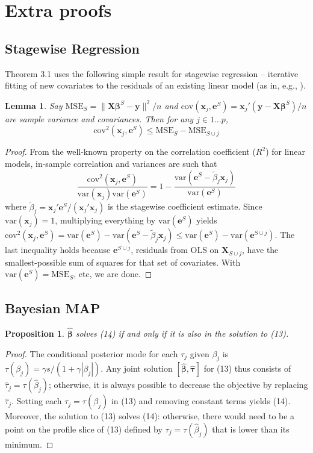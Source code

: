\documentclass[12pt]{article}
\newtheorem{prop}{\sc Proposition}[section]
\newtheorem{lemma}{\sc Lemma}[section]
\newcommand{\bs}[1]{\boldsymbol{#1}}
\newcommand{\mr}[1]{\mathrm{#1}}
\newcommand{\bm}[1]{\mathbf{#1}}
\begin{document}
\section{Extra proofs}

\subsection{Stagewise Regression}

Theorem 3.1 uses the following simple result for stagewise regression -- iterative fitting of new covariates to the residuals of an existing linear model (as in, e.g., \citealt{goldberger_stepwise_1961}). 
\begin{lemma}\label{SSElemma}
Say $\mr{MSE}_S = \|\bm{X}\bs{\beta}^S-\bm{y}\|^2/n$ and 
$\mr{cov}(\bs{x}_j,\bm{e}^S) = \bs{x}_j'(\bm{y}-\bm{X}\bs{\beta}^S)/n$ are sample variance and covariances.  Then for any $j \in 1\ldots p$, 
\[
\mr{cov}^2(\bs{x}_j,\bm{e}^S) \leq \mr{MSE}_S - \mr{MSE}_{S\cup j}
\]
\end{lemma}
\begin{proof}
From the well-known property on the correlation coefficient ($R^2$) for linear models,   
in-sample correlation and variances are such that
\[
\frac{\mr{cov}^2(\bs{x}_j,\bm{e}^S)}{\mr{var}(\bs{x}_j)\mr{var}(\bm{e}^S)} = 1 - \frac{\mr{var}(\bm{e}^S-\tilde\beta_j\bs{x}_j)}{\mr{var}(\bm{e}^S)}
\]
where $\tilde\beta_j = \bs{x}_j'\bm{e}^S/(\bs{x}_j'\bs{x}_j)$ is the stagewise coefficient estimate.  Since $\mr{var}(\bs{x}_j)=1$, multiplying everything by $\mr{var}(\bm{e}^S)$ yields $\mr{cov}^2(\bs{x}_j,\bm{e}^S) =
\mr{var}(\bm{e}^S) - \mr{var}(\bm{e}^S-\tilde\beta_j\bs{x}_j)
\leq \mr{var}(\bm{e}^S) - \mr{var}(\bm{e}^{S\cup j})$.
The last inequality holds because $\bm{e}^{S\cup j}$, residuals from OLS on $\bm{X}_{S\cup j}$, have the smallest-possible sum of squares for that set of covariates.  With $\mr{var}(\bm{e}^S) = \mr{MSE}_S$, etc, we are done.
\end{proof}

\subsection{Bayesian MAP}

\begin{prop}\label{penprop}
  $\bs{\hat\beta}$ solves (14) if and only if it is also in the
  solution to (13).
\end{prop}
\begin{proof}
  The conditional posterior mode for each $\tau_j$ given $\beta_j$
  is $\tau(\beta_j) = \gamma s/(1 + \gamma|\beta_j|)$.  Any joint solution
  $[\bs{\hat\beta},\bs{\hat\tau}]$ for (13) thus
  consists of $\hat{\tau}_{j} = \tau(\hat\beta_{j})$;
  otherwise, it is always possible to decrease the objective by
  replacing $\hat\tau_{j}$. Setting each $\tau_j = 
  \tau(\beta_j)$ in (13) and removing constant terms yields
  (14).  Moreover, the solution to (13) solves
  (14): otherwise, there would need to be a point on the profile
  slice of (13) defined by $\tau_{j} =
  \tau(\hat\beta_{j})$ that is lower than its minimum.
\end{proof}
\end{document}
